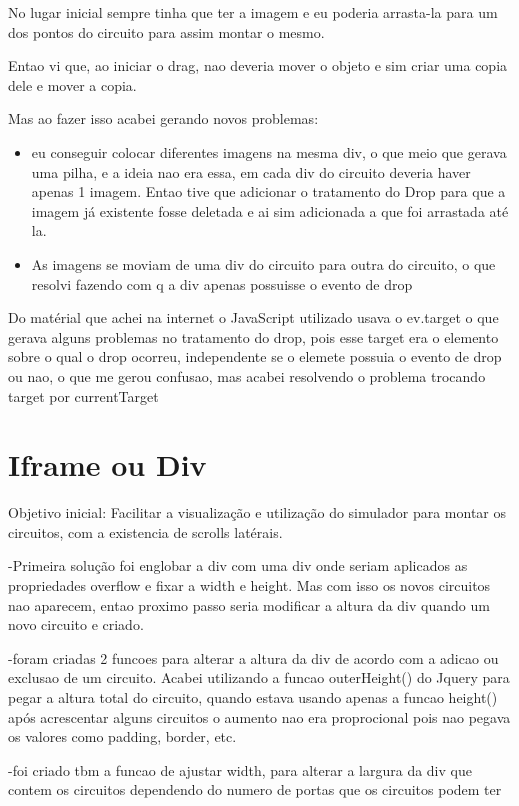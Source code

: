 \documentclass[a4paper, 12pt, oneside]{book}
\begin{document}
No lugar inicial sempre tinha que ter a imagem e eu poderia arrasta-la para um dos pontos do circuito para assim montar o mesmo.

Entao vi que, ao iniciar o drag, nao deveria mover o objeto e sim criar uma copia dele e mover a copia.

Mas ao fazer isso acabei gerando novos problemas: 
\begin{itemize}
\item eu conseguir colocar diferentes imagens na mesma div, o que meio que gerava uma pilha, e a ideia nao era essa, em cada div do circuito deveria haver apenas 1 imagem. Entao tive que adicionar o tratamento do Drop para que a imagem já existente fosse deletada e ai sim adicionada a que foi arrastada até la.
\item As imagens se moviam de uma div do circuito para outra do circuito, o que resolvi fazendo com q a div apenas possuisse o evento de drop
\end{itemize}
	
Do matérial que achei na internet o JavaScript utilizado usava o ev.target o que gerava alguns problemas no tratamento do drop, pois esse target era o elemento sobre o qual o drop ocorreu, independente se o elemete possuia o evento de drop ou nao, o que me gerou confusao, mas acabei resolvendo o problema trocando target por currentTarget

\section{Iframe ou Div}

Objetivo inicial: Facilitar a visualização e utilização do simulador para montar os circuitos, com a existencia de scrolls latérais.

-Primeira solução foi englobar a div com uma div onde seriam aplicados as propriedades overflow e fixar a width e height. Mas com isso os novos circuitos nao aparecem, entao proximo passo seria modificar a altura da div quando um novo circuito e criado.

-foram criadas 2 funcoes para alterar a altura da div de acordo com a adicao ou exclusao de um circuito. Acabei utilizando a funcao outerHeight() do Jquery para pegar a altura total do circuito, quando estava usando apenas a funcao height() após acrescentar alguns circuitos o aumento nao era proprocional pois nao pegava os valores como padding, border, etc.

-foi criado tbm a funcao de ajustar width, para alterar a largura da div que contem os circuitos dependendo do numero de portas que os circuitos podem ter
\end{document}
